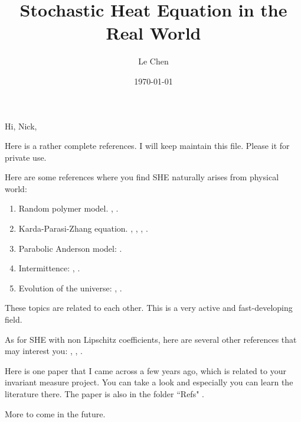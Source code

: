 \documentclass[a4paper,12pt]{article}
\title{Stochastic Heat Equation in the Real World}
\author{Le Chen}
\date{\today}
\theoremstyle{plain}
\theoremstyle{definition}
\begin{document}
\maketitle


Hi, Nick, 
\bigskip


Here is a rather complete references. I will keep maintain this file. Please it
for private use.
\bigskip


Here are some references where you find SHE naturally arises from physical
world:   
\begin{enumerate}
	\item Random polymer model. \cite{AmirCorwinQuastel11Stationary},
		\cite{Moreno14Pos}.  
	\item Karda-Parasi-Zhang equation. \cite{KPZ86}, \cite{Hairer2014RS},
		\cite{Quastel12KPZ}, \cite{GP15KPZ}.       
	\item Parabolic Anderson model: \cite{CarmonaMolchanov94}.  
	\item Intermittence:
		\cite{Zeldovich90Almighty}, \cite{BertiniCancrini94Intermittence}.
	\item Evolution of the universe: \cite{AMS94},
		\cite{BertiniEtc94Burgers}.  
\end{enumerate}
These topics are related to each other. This is a very active and
fast-developing field. 

\bigskip

As for SHE with non Lipschitz coefficients, here are several other references
that may interest you: 
\cite{DKZ19}, \cite{Mueller91Support}, \cite{FLN19}.   


\bigskip

Here is one paper that I came across a few years ago, which is related 
to your invariant measure project. You can take a look and especially 
you can learn the literature there. The paper is also in the 
folder ``Refs" \cite{BrzezniakOndrejatSeidler16Invariant}. 

More to come in the future. 
\end{document}
